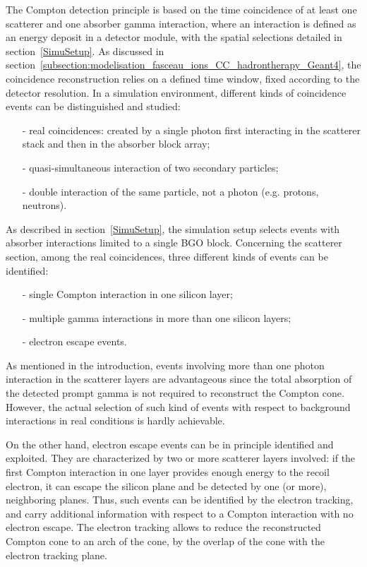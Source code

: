 The Compton detection principle is based on the time coincidence of at least one scatterer and one absorber gamma interaction, where an interaction is defined as an energy deposit in a detector module, with the spatial selections detailed in section~\ref{SimuSetup}. As discussed in section~\ref{subsection:modelisation_fasceau_ions_CC_hadrontherapy_Geant4}, the coincidence reconstruction relies on a defined time window, fixed according to the detector resolution. In a simulation environment, different kinds of coincidence events can be distinguished and studied: 
\begin{itemize}
\item[-] real coincidences: created by a single photon first interacting in the scatterer stack and then in the absorber block array;
\item[-] quasi-simultaneous interaction of two secondary particles;
\item[-] double interaction of the same particle, not a photon (e.g. protons, neutrons).
\end{itemize}
As described in section~\ref{SimuSetup}, the simulation setup selects events with absorber interactions limited to a single BGO block.
Concerning the scatterer section, among the real coincidences, three different kinds of events can be identified:
\begin{itemize}
\item[-] single Compton interaction in one silicon layer;
\item[-] multiple gamma interactions in more than one silicon layers;
\item[-] electron escape events.
\end{itemize}
As mentioned in the introduction, events involving more than one photon interaction in the scatterer layers are advantageous since the total absorption of the detected prompt gamma is not required to reconstruct the Compton cone. However, the actual selection of such kind of events with respect to background interactions in real conditions is hardly achievable.

On the other hand, electron escape events can be in principle identified and exploited. They are characterized by two or more scatterer layers involved: if the first Compton interaction in one layer provides enough energy to the recoil electron, it can escape the silicon plane and be detected by one (or more), neighboring planes. Thus, such events can be identified by the electron tracking, and carry additional information with respect to a Compton interaction with no electron escape. The electron tracking allows to reduce the reconstructed Compton cone to an arch of the cone, by the overlap of the cone with the electron tracking plane.      

